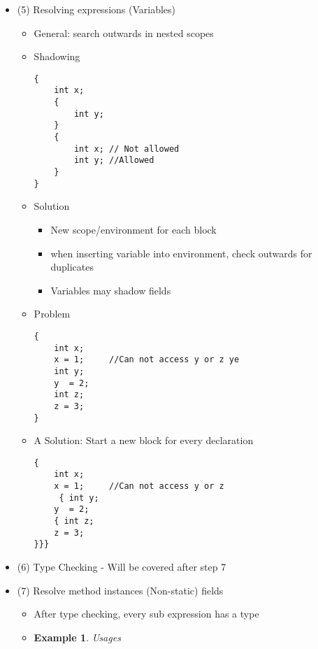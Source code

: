 \documentclass{article}
\newtheorem{ex}[theorem]{Example}
\begin{document}
\begin{itemize}
\begin{enumerate}
\color{red}
\item Disambiguate ambiguous namespace 
\begin{itemize}
\item In Java you can't simply determine the namespace based on location of usage
\end{itemize} 
\item Resolve "expressions" (Variables, static fields)
\item Type checking
\item Resolve methods instance (non-static) fields
\end{enumerate}
\item (5) Resolving expressions (Variables)
\begin{itemize}
\item General: search outwards in nested scopes
\item  Shadowing
\begin{lstlisting}
{
	int x;
	{
		int y; 
	}
	{
		int x; // Not allowed
		int y; //Allowed
	}
}
\end{lstlisting}
\item Solution 
\begin{itemize}
\item New scope/environment for each block
\item when inserting variable into environment, check outwards for duplicates
\item Variables may shadow fields 
\end{itemize}
\item Problem
\begin{lstlisting}
{
	int x;
	x = 1;     //Can not access y or z ye
	int y;
	y  = 2;
	int z;
	z = 3;
}	
\end{lstlisting}
\item A Solution: Start a new block for every declaration
\begin{lstlisting}
{
	int x;
	x = 1;     //Can not access y or z 
	 { int y;
	y  = 2;
	{ int z;
	z = 3; 
}}}
\end{lstlisting}
\end{itemize}
\item (6) Type Checking - Will be covered after step 7
\item (7) Resolve method instances (Non-static) fields
\begin{itemize}
\item After type checking, every sub expression has a type
\item \begin{ex} Usages

\end{ex}
\end{itemize}
\end{itemize}
\end{document}
